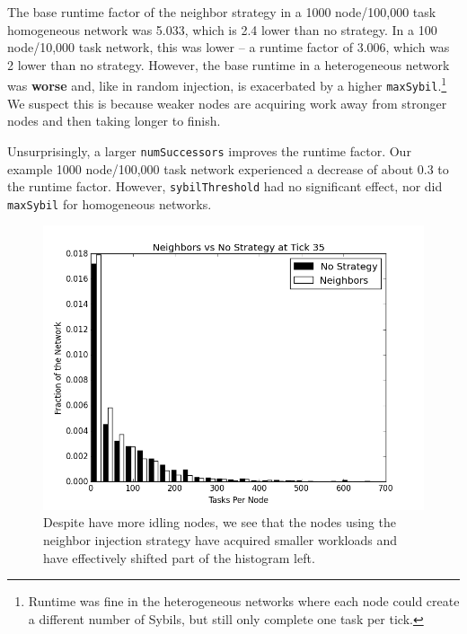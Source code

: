 \documentclass[10pt,conference]{IEEEtran}
\begin{document}
	The base runtime factor of the neighbor strategy in a 1000 node/100,000 task homogeneous network was 5.033, which is 2.4 lower than no strategy.
	In a 100 node/10,000 task network, this was lower -- a runtime factor of 3.006, which was 2 lower than no strategy.
	However, the base runtime in a heterogeneous network  was \textbf{worse} and, like in random injection, is exacerbated by a higher \texttt{maxSybil}.\footnote{Runtime was fine in the heterogeneous networks where each node could create a different number of Sybils, but still only complete one task per tick.}
	We suspect this is because weaker nodes are acquiring work away from stronger nodes and then taking longer to finish.
	
	
	Unsurprisingly, a larger \texttt{numSuccessors} improves the runtime factor.
	Our example 1000 node/100,000 task network experienced a decrease of about 0.3 to the runtime factor.
	However, \texttt{sybilThreshold} had no significant effect, nor did \texttt{maxSybil} for homogeneous networks.
	
	
%	
	
	\begin{figure}
		\centering
		\includegraphics[width=0.9\linewidth]{figs/neighborsStableHist35}
		\caption[Neighbor injection vs no strategy after 35 ticks.]{Despite have more idling nodes, we see that the nodes using the neighbor injection strategy have acquired smaller workloads and have effectively shifted part of the histogram left.}
		\label{fig:neighborsStableHist35}
	\end{figure}
	
\end{document}
